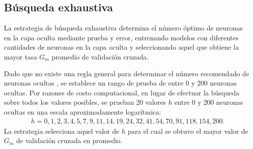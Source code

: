 %
\subsection{Búsqueda exhaustiva}
%
La estrategia de búsqueda exhaustiva determina el número óptimo
de neuronas en la capa oculta mediante prueba y error, entrenando
modelos con diferentes cantidades de neuronas en la capa oculta
y seleccionando aquel que obtiene la mayor tasa $G_m$ promedio de
validación cruzada.

Dado que no existe una regla general para determinar el número
recomendado de neuronas ocultas \cite{nnfaq3}, se establece un
rango de prueba de entre 0 y 200 neuronas ocultas.
Por razones de costo computacional, en lugar de efectuar la búsqueda
sobre todos los valores posibles, se prueban 20 valores $h$ entre 0 y
200 neuronas ocultas en una escala aproximadamente logarítmica:
%
\begin{align}
  \label{mlp-hidden-tries}
  h=0,1,2,3,4,5,7,9,11,14,19,24,32,41,54,70,91,118,154,200.
\end{align}
%
La estrategia selecciona aquel valor de $h$ para el cual se obtuvo
el mayor valor de $G_m$ de validación cruzada en promedio.

